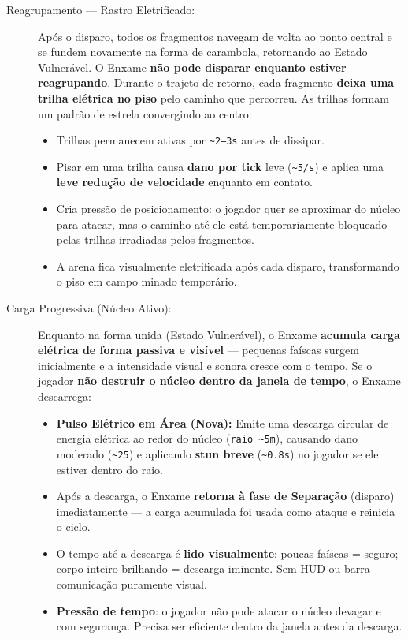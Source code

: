 \documentclass[a4paper,12pt]{report}
\begin{document}
\begin{description}
    \item[Reagrupamento --- Rastro Eletrificado:]
    Após o disparo, todos os fragmentos navegam de volta ao ponto central e se fundem novamente na forma de carambola, retornando ao Estado Vulnerável. O Enxame \textbf{não pode disparar enquanto estiver reagrupando}.
    Durante o trajeto de retorno, cada fragmento \textbf{deixa uma trilha elétrica no piso} pelo caminho que percorreu. As trilhas formam um padrão de estrela convergindo ao centro:
    \begin{itemize}
        \item Trilhas permanecem ativas por \texttt{\~{}2--3s} antes de dissipar.
        \item Pisar em uma trilha causa \textbf{dano por tick} leve (\texttt{\~{}5/s}) e aplica uma \textbf{leve redução de velocidade} enquanto em contato.
        \item Cria pressão de posicionamento: o jogador quer se aproximar do núcleo para atacar, mas o caminho até ele está temporariamente bloqueado pelas trilhas irradiadas pelos fragmentos.
        \item A arena fica visualmente eletrificada após cada disparo, transformando o piso em campo minado temporário.
    \end{itemize}
    \item[Carga Progressiva (Núcleo Ativo):]
    Enquanto na forma unida (Estado Vulnerável), o Enxame \textbf{acumula carga elétrica de forma passiva e visível} --- pequenas faíscas surgem inicialmente e a intensidade visual e sonora cresce com o tempo. Se o jogador \textbf{não destruir o núcleo dentro da janela de tempo}, o Enxame descarrega:
    \begin{itemize}
        \item \textbf{Pulso Elétrico em Área (Nova):} Emite uma descarga circular de energia elétrica ao redor do núcleo (\texttt{raio \~{}5m}), causando dano moderado (\texttt{\~{}25}) e aplicando \textbf{stun breve} (\texttt{\~{}0.8s}) no jogador se ele estiver dentro do raio.
        \item Após a descarga, o Enxame \textbf{retorna à fase de Separação} (disparo) imediatamente --- a carga acumulada foi usada como ataque e reinicia o ciclo.
        \item O tempo até a descarga é \textbf{lido visualmente}: poucas faíscas = seguro; corpo inteiro brilhando = descarga iminente. Sem HUD ou barra --- comunicação puramente visual.
        \item \textbf{Pressão de tempo}: o jogador não pode atacar o núcleo devagar e com segurança. Precisa ser eficiente dentro da janela antes da descarga.

\end{itemize}
\end{description}
\end{document}
